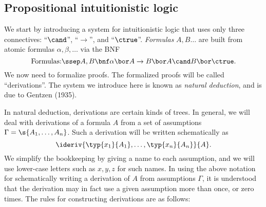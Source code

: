 \documentclass[12pt]{article}
\begin{document}
\subsection{Propositional intuitionistic logic}
\label{subsec-proplogic}

We start by introducing a system for intuitionistic logic that uses
only three connectives: ``$\cand$'', ``$\to$'', and ``$\ctrue$''.
{\em Formulas} $A,B\ldots$ are built from atomic formulas
$\alpha,\beta,\ldots$ via the BNF
\[ \mbox{Formulas:}\ssep A,B \bnf \alpha \bor A\to B\bor A\cand
B\bor\ctrue.
\]
We now need to formalize proofs. The formalized proofs will be called
``derivations''. The system we introduce here is known as {\em natural
  deduction}, and is due to Gentzen (1935).

In natural deduction, derivations are certain kinds of trees. In
general, we will deal with derivations of a formula $A$ from a
set of assumptions $\Gamma=\s{A_1,\ldots,A_n}$. Such a derivation will
be written schematically as
\[  \ideriv{\typ{x_1}{A_1},\ldots,\typ{x_n}{A_n}}{A}.
\]
We simplify the bookkeeping by giving a name to each assumption, and
we will use lower-case letters such as $x,y,z$ for such names.
In using the above notation for schematically writing a derivation of
$A$ from assumptions $\Gamma$, it is understood that the derivation
may in fact use a given assumption more than once, or zero times.
The rules for constructing derivations are as follows:
\end{document}
